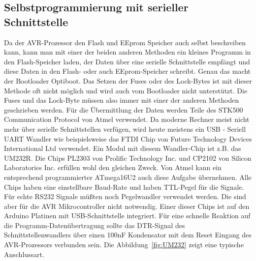 \subsection{Selbstprogrammierung mit serieller Schnittstelle}

Da der AVR-Prozessor den Flash und EEprom Speicher auch selbst beschreiben kann, kann man
mit einer der beiden anderen Methoden ein kleines Programm in den Flash-Speicher laden,
der Daten über eine serielle Schnittstelle empfängt und diese Daten in den Flash- oder
auch EEprom-Speicher schreibt. Genau das macht der Bootloader Optiboot.
Das Setzen der Fuses oder des Lock-Bytes ist mit dieser Methode oft nicht möglich und
wird auch vom Bootloader nicht unterstützt. Die Fuses und das Lock-Byte müssen also
immer mit einer der anderen Methoden geschrieben werden.
Für die Übermittlung der Daten werden Teile des STK500 Communication Protocol von Atmel verwendet.
Da moderne Rechner meist nicht mehr über serielle Schnittstellen verfügen, wird heute 
meistens ein USB - Seriell UART Wandler wie beispielsweise das FTDI Chip von Future Technology Devices
International Ltd verwendet. Ein Modul mit diesem Wandler-Chip ist z.B. das UM232R.
Die Chips PL2303 von Prolific Technology Inc. und CP2102 von Silicon Laboratories Inc. 
erfüllen wohl den gleichen Zweck.
Von Atmel kann ein entsprechend programmierter ATmega16U2 auch
diese Aufgabe übernehmen. 
Alle Chips haben eine einstellbare Baud-Rate und haben TTL-Pegel für die Signale.
Für echte RS232 Signale müßten noch Pegelwandler verwendet werden.
Die sind aber für die AVR Mikrocontroller nicht notwendig.
Einer dieser Chips ist auf den Arduino Platinen mit USB-Schnittstelle integriert.
Für eine schnelle Reaktion auf die Programm-Datenübertragung sollte das DTR-Signal des
Schnittstellenwandlers über einen 100nF Kondensator mit dem Reset Eingang des AVR-Prozessors
verbunden sein. Die Abbildung~\ref{fig:UM232} zeigt eine typische Anschlussart.

